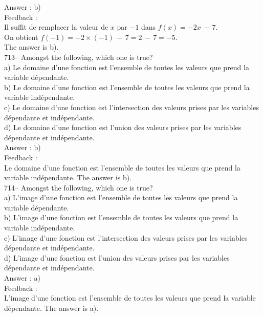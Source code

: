 ﻿\documentclass[letterpaper, 12pt]{article}
\begin{document}
Answer : b)\\

Feedback : \\
Il suffit de remplacer la valeur de $x$ par $-1$ dans $f(x)=-2x\,-\,7$.\\
On obtient $f(-1)=-2\times(-1)\,-\,7=2\,-\,7=-5$.\\
The answer is b).\\

713--  Amongst the following, which one is true?\\
a) Le domaine d'une fonction est l'ensemble de toutes les valeurs que prend
la variable d\'ependante.\\
b) Le domaine d'une fonction est l'ensemble de toutes les valeurs que prend
la variable ind\'ependante.\\
c) Le domaine d'une fonction est l'intersection des valeurs prises par les
variables d\'ependante et ind\'ependante.\\
d) Le domaine d'une fonction est l'union des valeurs prises par les
variables d\'ependante et ind\'ependante.\\

Answer : b)\\

Feedback : \\
Le domaine d'une fonction est l'ensemble de toutes les valeurs que prend la
variable ind\'ependante.  The answer is b).\\

714--  Amongst the following, which one is true?\\
a) L'image d'une fonction est l'ensemble de toutes les valeurs que prend la
variable d\'ependante.\\
b) L'image d'une fonction est l'ensemble de toutes les valeurs que prend la
variable ind\'ependante.\\
c) L'image d'une fonction est l'intersection des valeurs prises par les
variables d\'ependante et ind\'ependante.\\
d) L'image d'une fonction est l'union des valeurs prises par les variables
d\'ependante et ind\'ependante.\\

Answer : a)\\

Feedback : \\
L'image d'une fonction est l'ensemble de toutes les valeurs que prend la
variable d\'ependante.  The answer is a).\\
\end{document}
